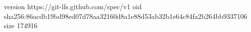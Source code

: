 version https://git-lfs.github.com/spec/v1
oid sha256:86acdb19bd98ed07d78aa32160d8a1e88d53ab32b1e64c84fa2b264bb9337106
size 174916
